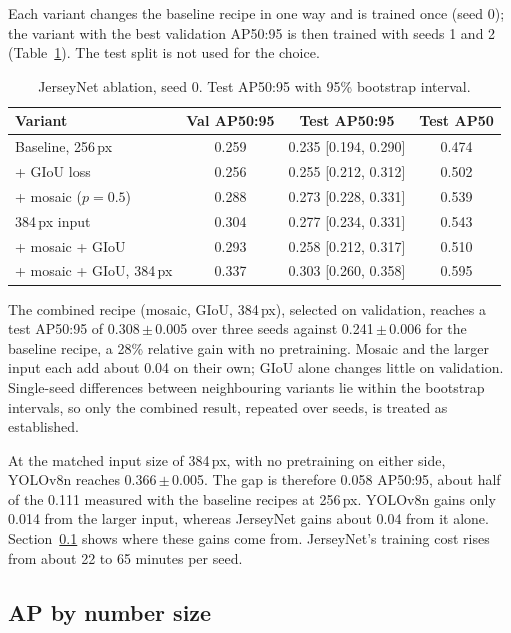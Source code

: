 \documentclass[10pt,a4paper]{article}
\newcommand{\pmv}[2]{#1\,$\pm$\,#2}
\begin{document}
Each variant changes the baseline recipe in one way and is trained once (seed 0); the variant with
the best validation AP50:95 is then trained with seeds 1 and 2 (Table~\ref{tab:ablation}). The
test split is not used for the choice.

\begin{table}[t]
\centering\small
\caption{JerseyNet ablation, seed 0. Test AP50:95 with 95\% bootstrap interval.}
\label{tab:ablation}
\setlength{\tabcolsep}{4pt}
\begin{tabular}{lccc}
\toprule
Variant & Val AP50:95 & Test AP50:95 & Test AP50 \\
\midrule
Baseline, 256\,px          & 0.259 & 0.235 [0.194, 0.290] & 0.474 \\
+ GIoU loss                & 0.256 & 0.255 [0.212, 0.312] & 0.502 \\
+ mosaic ($p=0.5$)         & 0.288 & 0.273 [0.228, 0.331] & 0.539 \\
384\,px input              & 0.304 & 0.277 [0.234, 0.331] & 0.543 \\
+ mosaic + GIoU            & 0.293 & 0.258 [0.212, 0.317] & 0.510 \\
+ mosaic + GIoU, 384\,px   & 0.337 & 0.303 [0.260, 0.358] & 0.595 \\
\bottomrule
\end{tabular}
\end{table}

The combined recipe (mosaic, GIoU, 384\,px), selected on validation, reaches a test AP50:95 of
\pmv{0.308}{0.005} over three seeds against \pmv{0.241}{0.006} for the baseline recipe, a 28\%
relative gain with no pretraining. Mosaic and the larger input each add about 0.04 on their own;
GIoU alone changes little on validation. Single-seed differences between neighbouring variants lie
within the bootstrap intervals, so only the combined result, repeated over seeds, is treated as
established.

At the matched input size of 384\,px, with no pretraining on either side, YOLOv8n reaches
\pmv{0.366}{0.005}. The gap is therefore 0.058 AP50:95, about half of the 0.111 measured with the
baseline recipes at 256\,px. YOLOv8n gains only 0.014 from the larger input, whereas JerseyNet
gains about 0.04 from it alone. Section~\ref{sec:size} shows where these gains come from.
JerseyNet's training cost rises from about 22 to 65 minutes per seed.

\subsection{AP by number size}
\label{sec:size}
\end{document}
